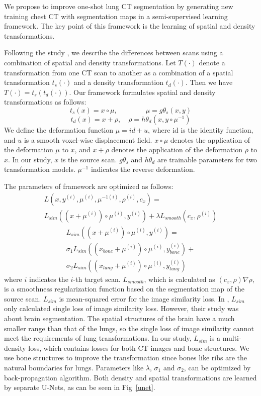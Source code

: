 \documentclass{article}
\def\L{{\cal L}}
\begin{document}
We propose to improve one-shot lung CT segmentation by generating new training chest CT with segmentation maps in a semi-supervised learning framework. The key point of this framework is the learning of spatial and density transformations.

Following the study \cite{zhao2019data}, we describe the differences between scans using a combination of spatial and density transformations. 
Let $T(\cdot)$ denote a transformation from one CT scan to another as a combination of a spatial transformation $t_s(\cdot)$ and a density transformation $t_d(\cdot)$. Then we have $T(\cdot)=t_s(t_d(\cdot))$. 
Our framework formulates spatial and density transformations as follows:
\begin{equation}
    t_s(x)=x\circ\mu,\qquad\qquad\mu=g\theta_s(x,y)
\end{equation}
\begin{equation}
    t_d(x)=x+\rho,\quad\rho=h\theta_d(x,y\circ\mu^{-1})
\end{equation}
We define the deformation function $\mu=id+u$, where id is the identity function, and $u$ is a smooth voxel-wise displacement field. 
$x\circ\mu$ denotes the application of the deformation $\mu$ to $x$, and $x+\rho$ denotes the application of the deformation $\rho$ to $x$.
In our study, $x$ is the source scan. $g\theta_s$ and $h\theta_d$ are trainable parameters for two transformation models. $\mu^{-1}$ indicates the reverse deformation. 

The parameters of framework are optimized as follows:
\begin{align*}
    L(x,y^{(i)},\mu^{(i)},\mu^{-1(i)},\rho^{(i)},c_x)=\qquad\qquad\\L_{sim}((x+\mu^{(i)})\circ\mu^{(i)}, y^{(i)})+\lambda L_{smooth}(c_x,\rho^{(i)})
\end{align*}
\begin{align*}
    L_{sim}((x+\mu^{(i)})\circ\mu^{(i)}, y^{(i)})=\quad\\\sigma_1L_{sim}((x_{bone}+\mu^{(i)})\circ\mu^{(i)}, y_{bone}^{(i)})+\\\sigma_2L_{sim}((x_{lung}+\mu^{(i)})\circ\mu^{(i)}, y_{lung}^{(i)})
\end{align*}
where $i$ indicates the $i$-th target scan. $L_{smooth}$, which is calculated as $(c_x,\rho)\nabla\rho$, is a smoothness regularization function based on the segmentation map of the source scan.
$L_{sim}$ is mean-squared error for the image similarity loss.
In \cite{zhao2019data}, $L_{sim}$ only calculated single loss of image similarity loss. However, their study was about brain segmentation. The spatial structures of the brain have a much smaller range than that of the lungs, so the single loss of image similarity cannot meet the requirements of lung transformations. In our study, $L_{sim}$ is a multi-density loss, which contains losses for both CT images and bone structures. We use bone structures to improve the transformation since bones like ribs are the natural boundaries for lungs. Parameters like $\lambda$, $\sigma_1$ and $\sigma_2$, can be optimized by back-propagation algorithm.
Both density and spatial transformations are learned by separate U-Nets, as can be seen in Fig~\ref{unet}.
\end{document}
